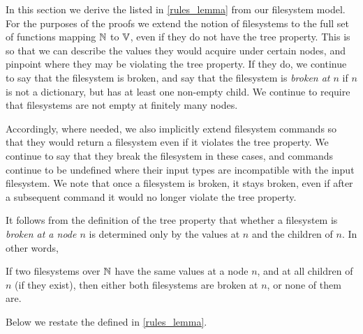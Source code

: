 
In this section we derive the  listed in
\cref{rules_lemma} from our filesystem model.
For the purposes of the proofs we extend the notion of filesystems 
to the full set of functions mapping $\mathbb{N}$ to $\mathbb{V}$, even if they
do not have the tree property.
This is so that we can describe the values they would acquire under certain nodes,
and pinpoint where they may be violating the tree property.
If they do, we continue to say that the filesystem is broken,
and say that the filesystem is \emph{broken at $n$} if 
$n$ is not a dictionary, but has at least one non-empty child.
We continue to require that filesystems are not empty at finitely many nodes.

Accordingly, where needed, we also implicitly extend filesystem commands
so that they would return a filesystem even if it violates the tree property.
We continue to say that they break the filesystem in these cases,
and commands continue to be undefined where their input types are incompatible
with the input filesystem.
We note that once a filesystem is broken, it stays broken, even if
after a subsequent command it would no longer violate the tree property.

It follows from the definition of the tree property that
whether a filesystem is \emph{broken at a node $n$} is determined only
by the values at $n$ and the children of $n$.
In other words,

\begin{myclm}
If two filesystems over $\mathbb{N}$ have the same values at a node $n$,
and at all children of $n$ (if they exist),
then either both filesystems are broken at $n$, or none of them are.
\end{myclm}

Below we restate the  defined in
\cref{rules_lemma}.

\begin{myaxproof}
\axaxseparatecommute
\end{myaxproof}

